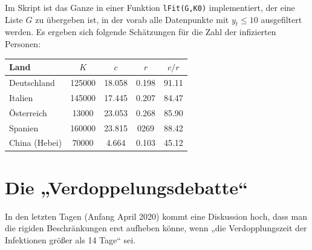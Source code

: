 \documentclass[a4paper,11pt]{article}
\begin{document}
Im Skript ist das Ganze in einer Funktion \texttt{lFit(G,K0)} implementiert,
der eine Liste $G$ zu übergeben ist, in der vorab alle Datenpunkte mit $y_t\le
10$ ausgefiltert werden.  Es ergeben sich folgende Schätzungen für die Zahl
der infizierten Personen:
\begin{center}
  \begin{tabular}{|l|c|c|c|c|}\hline
    Land & $K$ & $c$ & $r$ & $c/r$ \\\hline
    Deutschland & 125000 & 18.058 & 0.198 & 91.11\\
    Italien & 145000 & 17.445 & 0.207 & 84.47\\
    Österreich & 13000 & 23.053 & 0.268 & 85.90 \\
    Spanien & 160000 & 23.815 & 0269 & 88.42 \\
    China (Hebei) & 70000 & 4.664 & 0.103 & 45.12\\\hline
  \end{tabular}
\end{center}



\section{Die „Verdoppelungsdebatte“}

In den letzten Tagen (Anfang April 2020) kommt eine Diskussion hoch, dass man
die rigiden Beschränkungen erst aufheben könne, wenn „die Verdopplungszeit 
der Infektionen größer als 14 Tage“ sei. 
\end{document}
